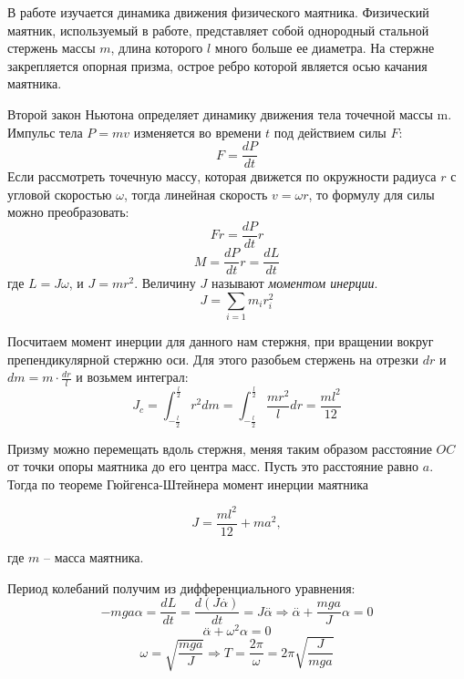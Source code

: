 	\par В работе изучается динамика движения физического маятника.
	Физический маятник, используемый в работе, представляет собой однородный стальной стержень массы $m$, длина которого $l$ много больше ее диаметра. На стержне закрепляется опорная призма, острое ребро которой является осью качания маятника.
	
	Второй закон Ньютона определяет динамику движения тела точечной массы m. Импульс тела $P=mv$ изменяется во времени $t$ под действием силы $F$:
	\begin{equation}
		F = \frac{dP}{dt}
	\end{equation}
	Если рассмотреть точечную массу, которая движется по окружности радиуса $r$ с угловой скоростью $\omega$, тогда линейная скорость $v = \omega r$, то формулу для силы можно преобразовать:
	\begin{equation}
		Fr = \frac{dP}{dt}r
	\end{equation}
	\begin{equation}
		M=\frac{dP}{dt}r=\frac{dL}{dt}
	\end{equation}
	\noindent где $L = J\omega$, и $J = mr^2$. Величину $J$ называют \textit{моментом инерции}.
	\begin{equation}
		J = \sum_{i=1} m_i r_i^2
	\end{equation}
	\par Посчитаем момент инерции для данного нам стержня, при вращении вокруг препендикулярной стержню оси. Для этого разобьем стержень на отрезки $dr$ и $dm = m\cdot\frac{dr}{l}$ и возьмем интеграл:
	\begin{equation}
		J_c = \int_{-\frac{l}{2}}^{\frac{l}{2}}r^2dm = \int_{-\frac{l}{2}}^{\frac{l}{2}}\frac{mr^2}{l}dr = \frac{ml^2}{12} 
	\end{equation}
	
	
	Призму можно перемещать вдоль стержня, меняя таким образом расстояние $ OC $ от точки опоры маятника до его центра масс. Пусть это расстояние равно $ a $. Тогда по теореме Гюйгенса-Штейнера момент инерции маятника
	
	\begin{equation}
		J=\frac{ml^2}{12}+ma^2,
	\end{equation}
	
	\noindent где $ m $ -- масса маятника.
	
	
	Период колебаний получим из дифференциального уравнения: 
	$$-m g a \alpha = \frac{dL}{dt} = \frac{d(J\overset{.}{\alpha})}{dt} = J \overset{..}{\alpha} \Rightarrow \overset{..}{\alpha}+\frac{m g a}{J} \alpha = 0 $$
	$$  \overset{..}{\alpha}+\omega^2 \alpha = 0$$ 
	$$ \omega = \sqrt{\frac{m g a}{J}} \Rightarrow T =  \frac{2\pi}{\omega} = 2\pi \sqrt{\frac{J}{m g a} }$$
	
